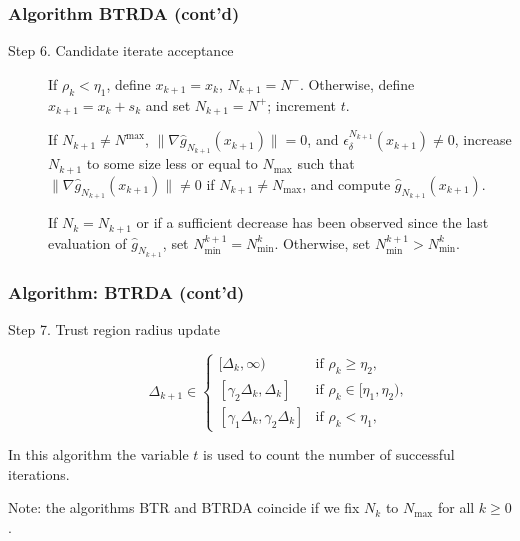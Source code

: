 \documentclass[aspectratio=169]{beamer}
\begin{document}
\begin{frame}
\frametitle{Algorithm BTRDA (cont'd)}

\begin{description}
\item[Step 6. Candidate iterate acceptance]
If $\rho_k < \eta_1$, define $x_{k+1} = x_k$, $N_{k+1} = N^-$.
Otherwise, define $x_{k+1} = x_k + s_k$ and set $N_{k+1} = N^+$;
increment $t$.

\mbox{}

If $N_{k+1} \ne N^{\max}$, $\| \nabla \hat{g}_{N_{k+1}}(x_{k+1})\| = 0$, and
$\epsilon_{\delta}^{N_{k+1}}(x_{k+1}) \ne 0$, increase $N_{k+1}$ to some size less or equal to $N_{\max}$ such that $\| \nabla \hat{g}_{N_{k+1}}(x_{k+1})\| \ne 0$ if $N_{k+1} \ne N_{\max}$, and compute $\hat{g}_{N_{k+1}}(x_{k+1})$.

\mbox{}

If $N_k = N_{k+1}$ or if a sufficient decrease has been observed since the last evaluation of $\hat{g}_{N_{k+1}}$, set $N_{\min}^{k+1} = N_{\min}^k$.
Otherwise, set $N_{\min}^{k+1} > N^k_{\min}$.
\end{description}

\end{frame}

\begin{frame}
\frametitle{Algorithm: BTRDA (cont'd)}

\begin{description}
\item[Step 7. Trust region radius update]
\[
\Delta_{k+1} \in \begin{cases}
[\Delta_k, \infty) & \mbox{if } \rho_k \geq \eta_2, \\
[\gamma_2 \Delta_k, \Delta_k] & \mbox{if } \rho_k \in [\eta_1, \eta_2),\\
[\gamma_1 \Delta_k, \gamma_2 \Delta_k] & \mbox{if } \rho_k < \eta_1,
\end{cases}
\]
\end{description}

\mbox{}

In this algorithm the variable $t$ is used to count the number of successful iterations.

\mbox{}

Note: the algorithms BTR and BTRDA coincide if we fix $N_k$ to $N_{\max}$ for all $k \geq 0$.

\end{frame}
\end{document}
